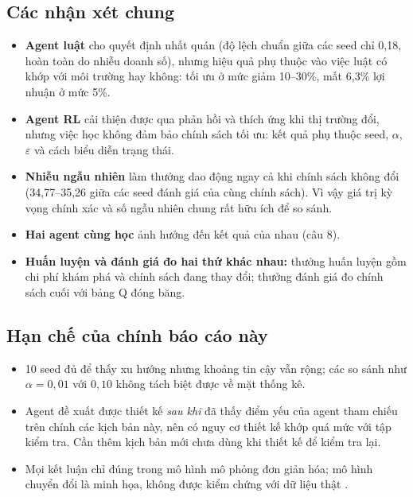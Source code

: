 \documentclass[12pt,a4paper]{report}
\begin{document}
\subsection{Các nhận xét chung}
\begin{itemize}
\item \textbf{Agent luật} cho quyết định nhất quán (độ lệch chuẩn giữa các seed chỉ
  0{,}18, hoàn toàn do nhiễu doanh số), nhưng hiệu quả phụ thuộc vào việc luật có
  khớp với môi trường hay không: tối ưu ở mức giảm 10--30\%, mất 6{,}3\% lợi nhuận
  ở mức 5\%.
\item \textbf{Agent RL} cải thiện được qua phản hồi và thích ứng khi thị trường đổi,
  nhưng việc học không đảm bảo chính sách tối ưu: kết quả phụ thuộc seed,
  $\alpha$, $\varepsilon$ và cách biểu diễn trạng thái.
\item \textbf{Nhiễu ngẫu nhiên} làm thưởng dao động ngay cả khi chính sách không đổi
  (34{,}77--35{,}26 giữa các seed đánh giá của cùng chính sách). Vì vậy giá trị kỳ
  vọng chính xác và số ngẫu nhiên chung rất hữu ích để so sánh.
\item \textbf{Hai agent cùng học} ảnh hưởng đến kết quả của nhau (câu 8).
\item \textbf{Huấn luyện và đánh giá đo hai thứ khác nhau:} thưởng huấn luyện gồm
  chi phí khám phá và chính sách đang thay đổi; thưởng đánh giá đo chính sách cuối
  với bảng Q đóng băng.
\end{itemize}

\subsection{Hạn chế của chính báo cáo này}
\begin{itemize}
\item 10 seed đủ để thấy xu hướng nhưng khoảng tin cậy vẫn rộng; các so sánh như
  $\alpha=0{,}01$ với $0{,}10$ không tách biệt được về mặt thống kê.
\item Agent đề xuất được thiết kế \emph{sau khi} đã thấy điểm yếu của agent tham
  chiếu trên chính các kịch bản này, nên có nguy cơ thiết kế khớp quá mức với tập
  kiểm tra. Cần thêm kịch bản mới chưa dùng khi thiết kế để kiểm tra lại.
\item Mọi kết luận chỉ đúng trong mô hình mô phỏng đơn giản hóa; mô hình chuyển đổi
  là minh họa, không được kiểm chứng với dữ liệu thật \cite{complementary}.
\end{itemize}
\end{document}
